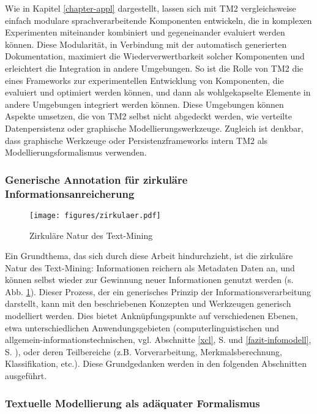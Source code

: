 \documentclass[abstracton, 12pt]{scrartcl}
\begin{document}
Wie in Kapitel \ref{chapter-appl} dargestellt, lassen sich mit TM2 vergleichsweise einfach modulare sprachverarbeitende Komponenten entwickeln, die in komplexen Experimenten miteinander kombiniert und gegeneinander evaluiert werden können. Diese Modularität, in Verbindung mit der automatisch generierten Dokumentation, maximiert die Wiederverwertbarkeit solcher Komponenten und erleichtert die Integration in andere Umgebungen. So ist die Rolle von TM2 die eines Frameworks zur experimentellen Entwicklung von Komponenten, die evaluiert und optimiert werden können, und dann als wohlgekapselte Elemente in andere Umgebungen integriert werden können. Diese Umgebungen können Aspekte umsetzen, die von TM2 selbst nicht abgedeckt werden, wie verteilte Datenpersistenz oder graphische Modellierungswerkzeuge. Zugleich ist denkbar, dass graphische Werkzeuge oder Persistenzframeworks intern TM2 als Modellierungsformalismus verwenden.

\subsubsection{Generische Annotation für zirkuläre Informationsanreicherung}

\begin{figure}
\begin{center}
  \texttt{[image: figures/zirkulaer.pdf]}
  \caption{Zirkuläre Natur des Text-Mining} \label{zirkulaer-fazit}
\end{center}
\end{figure}

Ein Grundthema, das sich durch diese Arbeit hindurchzieht, ist die zirkuläre Natur des Text-Mining: Informationen reichern als Metadaten Daten an, und können selbst wieder zur Gewinnung neuer Informationen genutzt werden (s. Abb. \ref{zirkulaer-fazit}). Dieser Prozess, der ein generisches Prinzip der Informationsverarbeitung darstellt, kann mit den beschriebenen Konzepten und Werkzeugen generisch modelliert werden. Dies bietet Anknüpfungspunkte auf verschiedenen Ebenen, etwa unterschiedlichen Anwendungsgebieten (computerlinguistischen und allgemein-informationstechnischen, vgl. Abschnitte \ref{xcl}, S. \pageref{xcl} und \ref{fazit-infomodell}, S. \pageref{fazit-infomodell}), oder deren Teilbereiche (z.B. Vorverarbeitung, Merkmalsberechnung, Klassifikation, etc.). Diese Grundgedanken werden in den folgenden Abschnitten ausgeführt.

\subsubsection{Textuelle Modellierung als adäquater Formalismus} 
\end{document}
